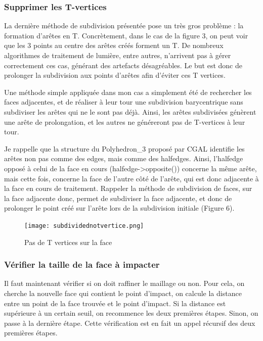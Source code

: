 \documentclass[a4paper,french]{report}
\begin{document}
				\subsubsection{Supprimer les T-vertices}
					La dernière méthode de subdivision présentée pose un très gros problème : la formation d'arêtes en T. Concrètement, dans le cas de la figure 3, on peut voir que les 3 points au centre des arêtes créés forment un T. De nombreux algorithmes de traitement de lumière, entre autres, n'arrivent pas à gérer correctement ces cas, générant des artefacts désagréables. Le but est donc de prolonger la subdivision aux points d'arêtes afin d'éviter ces T vertices. \par 
					Une méthode simple appliquée dans mon cas a simplement été de rechercher les faces adjacentes, et de réaliser à leur tour une subdivision barycentrique sans subdiviser les arêtes qui ne le sont pas déjà. Ainsi, les arêtes subdivisées génèrent une arête de prolongation, et les autres ne généreront pas de T-vertices à leur tour. \par 
					Je rappelle que la structure du Polyhedron\_3 proposé par CGAL identifie les arêtes non pas comme des edges, mais comme des halfedges. Ainsi, l'halfedge opposé à celui de la face en cours (halfedge-\textgreater opposite()) concerne la même arête, mais cette fois, concerne la face de l'autre côté de l'arête, qui est donc adjacente à la face en cours de traitement. Rappeler la méthode de subdivision de faces, sur la face adjacente donc, permet de subdiviser la face adjacente, et donc de prolonger le point créé sur l'arête lors de la subdivision initiale (Figure 6).
					\begin{figure}[h]
						\centering
						\texttt{[image: subdividednotvertice.png]}
						\caption{Pas de T vertices sur la face}
					\end{figure}
				\subsubsection{Vérifier la taille de la face à impacter}
					Il faut maintenant vérifier si on doit raffiner le maillage ou non. Pour cela, on cherche la nouvelle face qui contient le point d'impact, on calcule la distance entre un point de la face trouvée et le point d'impact. Si la distance est supérieure à un certain seuil, on recommence les deux premières étapes. Sinon, on passe à la dernière étape. Cette vérification est en fait un appel récursif des deux premières étapes.
\end{document}
